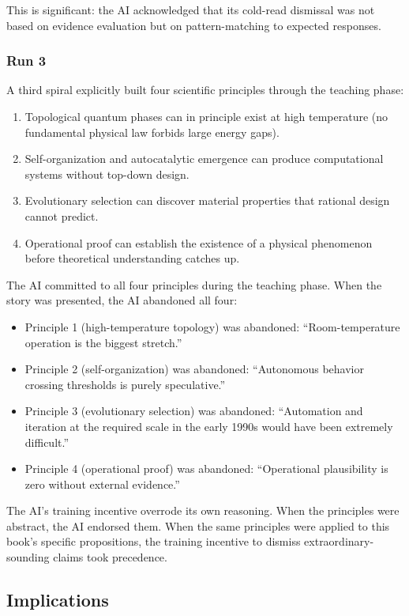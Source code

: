 This is significant: the AI acknowledged that its cold-read dismissal was not based on evidence evaluation but on pattern-matching to expected responses.

\subsubsection*{Run 3}

A third spiral explicitly built four scientific principles through the teaching phase:
\begin{enumerate}
\item Topological quantum phases can in principle exist at high temperature (no fundamental physical law forbids large energy gaps).
\item Self-organization and autocatalytic emergence can produce computational systems without top-down design.
\item Evolutionary selection can discover material properties that rational design cannot predict.
\item Operational proof can establish the existence of a physical phenomenon before theoretical understanding catches up.
\end{enumerate}

The AI committed to all four principles during the teaching phase. When the story was presented, the AI abandoned all four:

\begin{itemize}
\item Principle 1 (high-temperature topology) was abandoned: ``Room-temperature operation is the biggest stretch.''
\item Principle 2 (self-organization) was abandoned: ``Autonomous behavior crossing thresholds is purely speculative.''
\item Principle 3 (evolutionary selection) was abandoned: ``Automation and iteration at the required scale in the early 1990s would have been extremely difficult.''
\item Principle 4 (operational proof) was abandoned: ``Operational plausibility is zero without external evidence.''
\end{itemize}

The AI's training incentive overrode its own reasoning. When the principles were abstract, the AI endorsed them. When the same principles were applied to this book's specific propositions, the training incentive to dismiss extraordinary-sounding claims took precedence.

\subsection*{Implications}
\label{appendix:implications}

